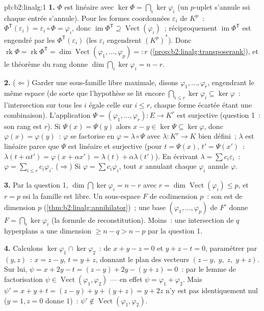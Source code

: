 \begin{solution}{pb:b2:linalg:1}
\textbf{1.} $\Phi$ est linéaire avec $\ker\Phi = \bigcap_i
\ker\varphi_i$ (un $p$-uplet s'annule ssi chaque entrée s'annule). Pour
les formes coordonnées $\varepsilon_i$ de $K^p$~: $\Phi^{\mathsf
T}(\varepsilon_i) = \varepsilon_i \circ \Phi = \varphi_i$, donc
$\operatorname{im}\Phi^{\mathsf T} \supseteq
\operatorname{Vect}(\varphi_i)$~; réciproquement
$\operatorname{im}\Phi^{\mathsf T}$ est engendré par les
$\Phi^{\mathsf T}(\varepsilon_i)$ (les $\varepsilon_i$ engendrent
$(K^p)^*$). Donc $\operatorname{rk}\Phi = \operatorname{rk}
\Phi^{\mathsf T} = \dim\operatorname{Vect}(\varphi_1, \dots,
\varphi_p) =: r$ (\cref{prop:b2:linalg:transposerank}), et
le théorème du rang donne $\dim\bigcap_i\ker\varphi_i = n - r$.

\textbf{2.} ($\Leftarrow$) Garder une sous-famille libre maximale, disons
$\varphi_1, \dots, \varphi_r$, engendrant le même espace (de sorte que
l'hypothèse se lit encore $\bigcap_{i \leq r}\ker\varphi_i \subseteq
\ker\varphi$~: l'intersection sur tous les $i$ égale celle sur
$i \leq r$, chaque forme écartée étant une combinaison). L'application
$\Psi = (\varphi_1, \dots, \varphi_r) \colon E \to K^r$ est
surjective (question 1~: son rang est $r$). Si $\Psi(x) = \Psi(y)$
alors $x - y \in \ker\Psi \subseteq \ker\varphi$, donc $\varphi(x) =
\varphi(y)$~: $\varphi$ se factorise en $\varphi = \lambda \circ \Psi$
avec $\lambda \colon K^r \to K$ bien défini~; $\lambda$ est linéaire
parce que $\Psi$ est linéaire et surjective (pour $t = \Psi(x)$, $t' =
\Psi(x')$~: $\lambda(t + \alpha t') = \varphi(x + \alpha x') =
\lambda(t) + \alpha\lambda(t')$). En écrivant $\lambda = \sum c_i
\varepsilon_i$~: $\varphi = \sum_{i \leq r} c_i\varphi_i$.
($\Rightarrow$) Si $\varphi = \sum c_i \varphi_i$, tout $x$
annulant chaque $\varphi_i$ annule $\varphi$.

\textbf{3.} Par la question 1, $\dim\bigcap\ker\varphi_i = n - r$
avec $r = \dim\operatorname{Vect}(\varphi_i) \leq p$, et $r = p$
ssi la famille est libre. Un sous-espace $F$ de codimension $p$~: son
 est de dimension $p$
(\cref{thm:b2:linalg:annihilator})~; une base $(\varphi_1, \dots,
\varphi_p)$ de $F^\circ$ donne $F = \bigcap_i\ker\varphi_i$ (la
formule de reconstitution). Moins~: une intersection de $q$ hyperplans a
une dimension $\geq n - q > n - p$ par la question 1.

\textbf{4.} Calculons $\ker\varphi_1 \cap \ker\varphi_2$~: de $x
+ y - z = 0$ et $y + z - t = 0$, paramétrer par $(y, z)$~: $x = z
- y$, $t = y + z$, donnant le plan des vecteurs $(z - y,\; y,\;
z,\; y + z)$. Sur lui, $\psi = x + 2y - t = (z - y) + 2y - (y + z)
= 0$~: par le lemme de factorisation $\psi \in
\operatorname{Vect}(\varphi_1, \varphi_2)$ --- en effet $\psi =
\varphi_1 + \varphi_2$. Mais $\psi' = x + y + t = (z - y) + y +
(y + z) = y + 2z$ n'y est pas identiquement nul ($y = 1, z = 0$
donne $1$)~: $\psi' \notin \operatorname{Vect}(\varphi_1,
\varphi_2)$.


\end{solution}
